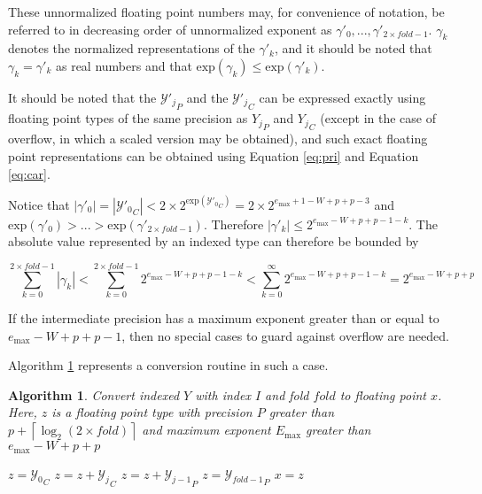 \documentclass[12pt]{article}
\providecommand{\ceil}[1]{\left \lceil #1 \right \rceil }
\providecommand{\exp}{\ensuremath{\text{exp}}}
\providecommand{\max}{\ensuremath{\text{max}}}
\providecommand{\To}{\ensuremath{\text{ to }}}
\theoremstyle{plain}
\newtheorem{alg}{Algorithm}[section]
\numberwithin{equation}{section}
\begin{document}
    These unnormalized floating point numbers may, for convenience of notation, be referred to in decreasing order of unnormalized exponent as $\gamma'_0, ..., \gamma'_{2 \times fold - 1}$.
    $\gamma_k$ denotes the normalized representations of the $\gamma'_k$, and it should be noted that $\gamma_k = \gamma'_k$ as real numbers and that $\exp(\gamma_k) \leq \exp(\gamma'_k)$.

    It should be noted that the ${\mathcal{Y}'_j}_P$ and the ${\mathcal{Y}'_j}_C$ can be expressed exactly using floating point types of the same precision as ${Y_j}_P$ and ${Y_j}_C$ (except in the case of overflow, in which a scaled version may be obtained), and such exact floating point representations can be obtained using Equation \ref{eq:pri} and Equation \ref{eq:car}.

    Notice that $|\gamma'_0| = |{\mathcal{Y}'_0}_C| < 2 \times 2^{\exp({\mathcal{Y}'_0}_C)} = 2 \times 2^{e_{\max} + 1 - W + p + p - 3}$ and $\exp(\gamma'_0) > ... > \exp(\gamma'_{2 \times fold - 1})$.  Therefore $|\gamma'_k| \leq 2^{e_{\max} - W + p + p - 1 - k}$. The absolute value represented by an indexed type can therefore be bounded by

    \begin{equation}
      \label{eq:maxindexedvalue}
      \sum\limits_{k = 0}^{2 \times fold - 1} |\gamma_k| < \sum\limits_{k = 0}^{2 \times fold - 1} 2^{e_{\max} - W + p + p - 1 - k} < \sum\limits_{k = 0}^{\infty} 2^{e_{\max} - W + p + p - 1 - k} = 2^{e_{\max} - W + p + p}
    \end{equation}

    If the intermediate precision has a maximum exponent greater than or equal to $e_{\max} - W + p + p - 1$, then no special cases to guard against overflow are needed.

    Algorithm \ref{alg:conv2float} represents a conversion routine in such a case.

    \begin{alg}
      Convert indexed $Y$ with index $I$ and fold $fold$ to floating point $x$. Here, $z$ is a floating point type with precision $P$ greater than $p + \ceil{\log_2(2 \times fold)}$ and maximum exponent $E_{\max}$ greater than $e_{\max} - W + p + p$
      \begin{algorithmic}[1]
          \State $z = {\mathcal{Y}_0}_C$
          \For{$j = 1 \To fold - 1$}
            \State $z = z + {\mathcal{Y}_j}_C$
            \State $z = z + {\mathcal{Y}_{j - 1}}_P$
          \EndFor
          \State $z = {\mathcal{Y}_{fold - 1}}_P$
          \State $x = z$
        \EndFunction
      \end{algorithmic}
      \label{alg:conv2float}
    \end{alg}
\end{document}
